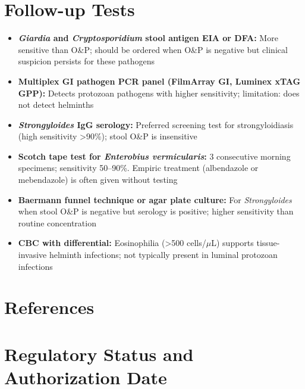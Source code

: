 \section*{Follow-up Tests}
\begin{itemize}
  \item \textbf{\textit{Giardia} and \textit{Cryptosporidium} stool antigen EIA or DFA:} More sensitive than O\&P; should be ordered when O\&P is negative but clinical suspicion persists for these pathogens
  \item \textbf{Multiplex GI pathogen PCR panel (FilmArray GI, Luminex xTAG GPP):} Detects protozoan pathogens with higher sensitivity; limitation: does not detect helminths
  \item \textbf{\textit{Strongyloides} IgG serology:} Preferred screening test for strongyloidiasis (high sensitivity >90\%); stool O\&P is insensitive
  \item \textbf{Scotch tape test for \textit{Enterobius vermicularis}:} 3 consecutive morning specimens; sensitivity 50--90\%. Empiric treatment (albendazole or mebendazole) is often given without testing
  \item \textbf{Baermann funnel technique or agar plate culture:} For \textit{Strongyloides} when stool O\&P is negative but serology is positive; higher sensitivity than routine concentration
  \item \textbf{CBC with differential:} Eosinophilia (>500 cells/$\mu$L) supports tissue-invasive helminth infections; not typically present in luminal protozoan infections
\end{itemize}

\section*{References}



\clearpage
\section*{Regulatory Status and Authorization Date}

\clearpage
